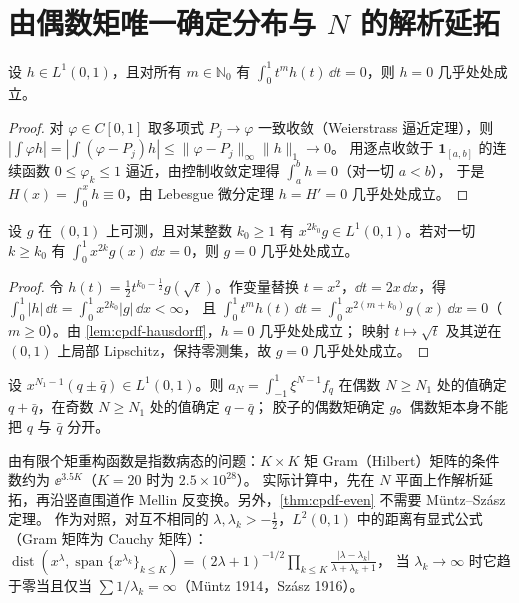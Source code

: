\section{由偶数矩唯一确定分布与 $N$ 的解析延拓}\label{sec:cpdf-unique}

\begin{lemma}\tagR\label{lem:cpdf-hausdorff}
设 $h\in L^1(0,1)$，且对所有 $m\in\mathbb N_0$ 有 $\int_0^1t^mh(t)\,\dd t=0$，则 $h=0$ 几乎处处成立。
\end{lemma}
\begin{proof}
对 $\varphi\in C[0,1]$ 取多项式 $P_j\to\varphi$ 一致收敛（Weierstrass 逼近定理），则
$|\int\varphi h|=|\int(\varphi-P_j)h|\le\|\varphi-P_j\|_\infty\|h\|_1\to0$。
用逐点收敛于 $\mathbf 1_{[a,b]}$ 的连续函数 $0\le\varphi_k\le1$ 逼近，由控制收敛定理得 $\int_a^bh=0$（对一切 $a<b$），
于是 $H(x)=\int_0^xh\equiv0$，由 Lebesgue 微分定理 $h=H'=0$ 几乎处处成立。
\end{proof}

\begin{theorem}[偶数矩足以确定函数]\tagR\label{thm:cpdf-even}
设 $g$ 在 $(0,1)$ 上可测，且对某整数 $k_0\ge1$ 有 $x^{2k_0}g\in L^1(0,1)$。若对一切 $k\ge k_0$ 有 $\int_0^1x^{2k}g(x)\,\dd x=0$，则 $g=0$ 几乎处处成立。
\end{theorem}
\begin{proof}
令 $h(t)=\frac12t^{k_0-\frac12}g(\sqrt t)$。作变量替换 $t=x^2$，$\dd t=2x\,\dd x$，得 $\int_0^1|h|\,\dd t=\int_0^1x^{2k_0}|g|\,\dd x<\infty$，
且 $\int_0^1t^mh(t)\,\dd t=\int_0^1x^{2(m+k_0)}g(x)\,\dd x=0$（$m\ge0$）。由 \cref{lem:cpdf-hausdorff}，$h=0$ 几乎处处成立；
映射 $t\mapsto\sqrt t$ 及其逆在 $(0,1)$ 上局部 Lipschitz，保持零测集，故 $g=0$ 几乎处处成立。
\end{proof}

\begin{corollary}\label{cor:cpdf-pdf-unique}
设 $x^{N_1-1}(q\pm\bar q)\in L^1(0,1)$。则 $a_N=\int_{-1}^1\xi^{N-1}f_q$ 在偶数 $N\ge N_1$ 处的值确定 $q+\bar q$，在奇数 $N\ge N_1$ 处的值确定 $q-\bar q$；
胶子的偶数矩确定 $g$。偶数矩本身{\heiti 不能}把 $q$ 与 $\bar q$ 分开。
\end{corollary}

\begin{remark}[唯一性不等于稳定性]
由有限个矩重构函数是指数病态的问题：$K\times K$ 矩 Gram（Hilbert）矩阵的条件数约为 $\ee^{3.5K}$（$K=20$ 时为 $2.5\times10^{28}$）。
实际计算中，先在 $N$ 平面上作解析延拓，再沿竖直围道作 Mellin 反变换。另外，\cref{thm:cpdf-even} 不需要 Müntz--Szász 定理。
作为对照，对互不相同的 $\lambda,\lambda_k>-\frac12$，$L^2(0,1)$ 中的距离有显式公式（Gram 矩阵为 Cauchy 矩阵）：
$\operatorname{dist}(x^\lambda,\operatorname{span}\{x^{\lambda_k}\}_{k\le K})=(2\lambda+1)^{-1/2}\prod_{k\le K}\frac{|\lambda-\lambda_k|}{\lambda+\lambda_k+1}$，
当 $\lambda_k\to\infty$ 时它趋于零当且仅当 $\sum1/\lambda_k=\infty$（Müntz 1914，Szász 1916）。
\end{remark}


